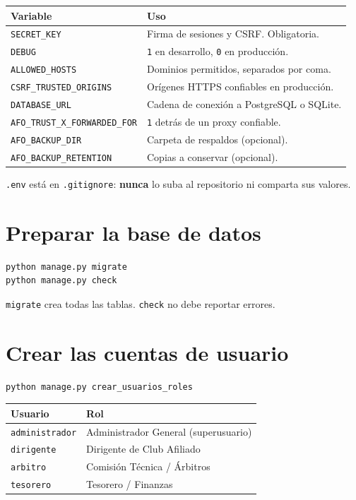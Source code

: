 \documentclass[11pt,a4paper]{article}
\newcommand{\campo}[1]{\texttt{\small #1}}
\begin{document}
\begin{tabularx}{\textwidth}{@{}l X@{}}
\toprule
\textbf{Variable} & \textbf{Uso}\\
\midrule
\campo{SECRET\_KEY} & Firma de sesiones y CSRF. Obligatoria.\\
\campo{DEBUG} & \campo{1} en desarrollo, \campo{0} en producción.\\
\campo{ALLOWED\_HOSTS} & Dominios permitidos, separados por coma.\\
\campo{CSRF\_TRUSTED\_ORIGINS} & Orígenes HTTPS confiables en producción.\\
\campo{DATABASE\_URL} & Cadena de conexión a PostgreSQL o SQLite.\\
\campo{AFO\_TRUST\_X\_FORWARDED\_FOR} & \campo{1} detrás de un proxy confiable.\\
\campo{AFO\_BACKUP\_DIR} & Carpeta de respaldos (opcional).\\
\campo{AFO\_BACKUP\_RETENTION} & Copias a conservar (opcional).\\
\bottomrule
\end{tabularx}

\medskip
\campo{.env} está en \campo{.gitignore}: \textbf{nunca} lo suba al repositorio
ni comparta sus valores.

\section{Preparar la base de datos}

\begin{lstlisting}
python manage.py migrate
python manage.py check
\end{lstlisting}

\campo{migrate} crea todas las tablas. \campo{check} no debe reportar errores.

\section{Crear las cuentas de usuario}

\begin{lstlisting}
python manage.py crear_usuarios_roles
\end{lstlisting}

\begin{tabularx}{\textwidth}{@{}l X@{}}
\toprule
\textbf{Usuario} & \textbf{Rol}\\
\midrule
\campo{administrador} & Administrador General (superusuario)\\
\campo{dirigente} & Dirigente de Club Afiliado\\
\campo{arbitro} & Comisión Técnica / Árbitros\\
\campo{tesorero} & Tesorero / Finanzas\\
\bottomrule
\end{tabularx}
\end{document}
